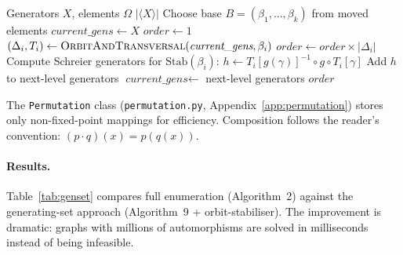 \documentclass[twoside]{article}
\begin{document}
\begin{algorithm}[H]
\caption{Group Order via Stabiliser Chain (Proposition~5.18)}\label{alg:group_order}
\begin{algorithmic}[1]
\Require Generators $X$, elements $\Omega$
\Ensure $|\langle X \rangle|$
\State Choose base $B = (\beta_1, \ldots, \beta_k)$ from moved elements
\State $\textit{current\_gens} \gets X$
\State $\textit{order} \gets 1$
    \State $(\Delta_i, T_i) \gets \textsc{OrbitAndTransversal}(\textit{current\_gens}, \beta_i)$
    \State $\textit{order} \gets \textit{order} \times |\Delta_i|$
    \State Compute Schreier generators for $\text{Stab}(\beta_i)$:
        \State $h \gets T_i[g(\gamma)]^{-1} \circ g \circ T_i[\gamma]$
            \State Add $h$ to next-level generators
        \EndIf
    \EndFor
    \State $\textit{current\_gens} \gets$ next-level generators
\EndFor
\State \Return $\textit{order}$
\end{algorithmic}
\end{algorithm}

The \texttt{Permutation} class (\texttt{permutation.py}, Appendix~\ref{app:permutation}) stores only non-fixed-point mappings for efficiency. Composition follows the reader's convention: $(p \cdot q)(x) = p(q(x))$.

\paragraph{Results.}
Table~\ref{tab:genset} compares full enumeration (Algorithm~2) against the generating-set approach (Algorithm~9 + orbit-stabiliser). The improvement is dramatic: graphs with millions of automorphisms are solved in milliseconds instead of being infeasible.
\end{document}
